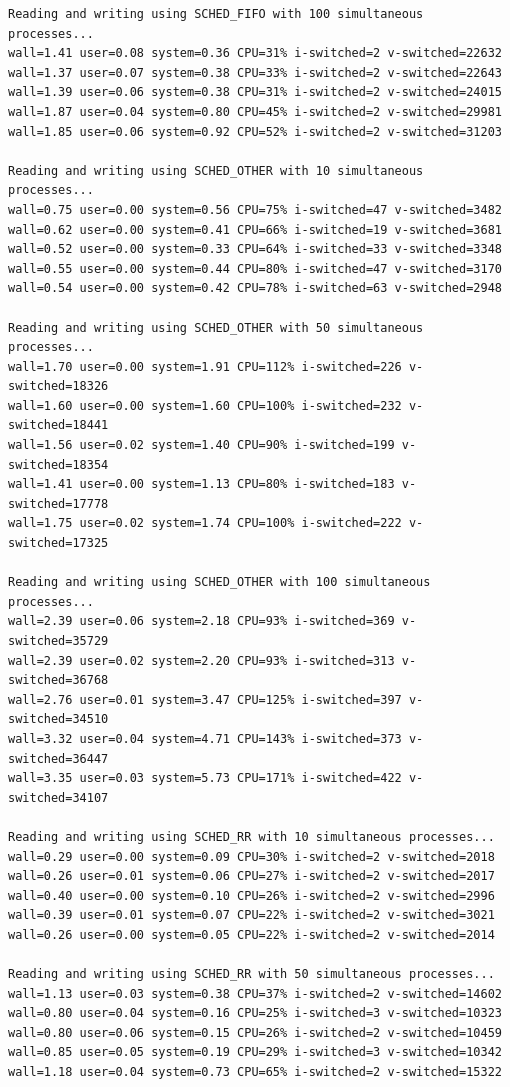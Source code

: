 \documentclass[12pt]{article}
\begin{document}
\begin{small}
\begin{verbatim}
Reading and writing using SCHED_FIFO with 100 simultaneous processes...
wall=1.41 user=0.08 system=0.36 CPU=31% i-switched=2 v-switched=22632
wall=1.37 user=0.07 system=0.38 CPU=33% i-switched=2 v-switched=22643
wall=1.39 user=0.06 system=0.38 CPU=31% i-switched=2 v-switched=24015
wall=1.87 user=0.04 system=0.80 CPU=45% i-switched=2 v-switched=29981
wall=1.85 user=0.06 system=0.92 CPU=52% i-switched=2 v-switched=31203

Reading and writing using SCHED_OTHER with 10 simultaneous processes...
wall=0.75 user=0.00 system=0.56 CPU=75% i-switched=47 v-switched=3482
wall=0.62 user=0.00 system=0.41 CPU=66% i-switched=19 v-switched=3681
wall=0.52 user=0.00 system=0.33 CPU=64% i-switched=33 v-switched=3348
wall=0.55 user=0.00 system=0.44 CPU=80% i-switched=47 v-switched=3170
wall=0.54 user=0.00 system=0.42 CPU=78% i-switched=63 v-switched=2948

Reading and writing using SCHED_OTHER with 50 simultaneous processes...
wall=1.70 user=0.00 system=1.91 CPU=112% i-switched=226 v-switched=18326
wall=1.60 user=0.00 system=1.60 CPU=100% i-switched=232 v-switched=18441
wall=1.56 user=0.02 system=1.40 CPU=90% i-switched=199 v-switched=18354
wall=1.41 user=0.00 system=1.13 CPU=80% i-switched=183 v-switched=17778
wall=1.75 user=0.02 system=1.74 CPU=100% i-switched=222 v-switched=17325

Reading and writing using SCHED_OTHER with 100 simultaneous processes...
wall=2.39 user=0.06 system=2.18 CPU=93% i-switched=369 v-switched=35729
wall=2.39 user=0.02 system=2.20 CPU=93% i-switched=313 v-switched=36768
wall=2.76 user=0.01 system=3.47 CPU=125% i-switched=397 v-switched=34510
wall=3.32 user=0.04 system=4.71 CPU=143% i-switched=373 v-switched=36447
wall=3.35 user=0.03 system=5.73 CPU=171% i-switched=422 v-switched=34107

Reading and writing using SCHED_RR with 10 simultaneous processes...
wall=0.29 user=0.00 system=0.09 CPU=30% i-switched=2 v-switched=2018
wall=0.26 user=0.01 system=0.06 CPU=27% i-switched=2 v-switched=2017
wall=0.40 user=0.00 system=0.10 CPU=26% i-switched=2 v-switched=2996
wall=0.39 user=0.01 system=0.07 CPU=22% i-switched=2 v-switched=3021
wall=0.26 user=0.00 system=0.05 CPU=22% i-switched=2 v-switched=2014

Reading and writing using SCHED_RR with 50 simultaneous processes...
wall=1.13 user=0.03 system=0.38 CPU=37% i-switched=2 v-switched=14602
wall=0.80 user=0.04 system=0.16 CPU=25% i-switched=3 v-switched=10323
wall=0.80 user=0.06 system=0.15 CPU=26% i-switched=2 v-switched=10459
wall=0.85 user=0.05 system=0.19 CPU=29% i-switched=3 v-switched=10342
wall=1.18 user=0.04 system=0.73 CPU=65% i-switched=2 v-switched=15322


\end{verbatim}
\end{small}
\end{document}
